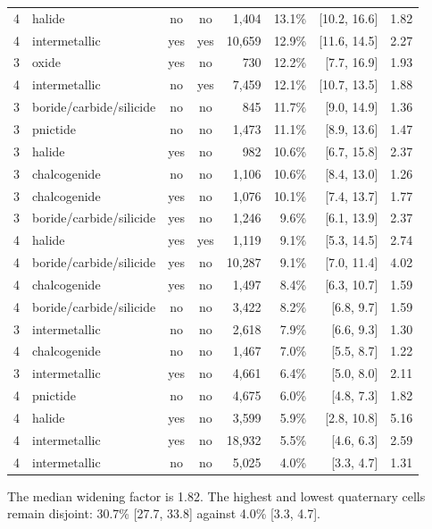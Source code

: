 \documentclass[11pt]{article}
\begin{document}
\begin{longtable}{llccrrrr}
4 & halide & no & no & 1{,}404 & 13.1\% & [10.2, 16.6] & 1.82 \\
4 & intermetallic & yes & yes & 10{,}659 & 12.9\% & [11.6, 14.5] & 2.27 \\
3 & oxide & yes & no & 730 & 12.2\% & [7.7, 16.9] & 1.93 \\
4 & intermetallic & no & yes & 7{,}459 & 12.1\% & [10.7, 13.5] & 1.88 \\
3 & boride/carbide/silicide & no & no & 845 & 11.7\% & [9.0, 14.9] & 1.36 \\
3 & pnictide & no & no & 1{,}473 & 11.1\% & [8.9, 13.6] & 1.47 \\
3 & halide & yes & no & 982 & 10.6\% & [6.7, 15.8] & 2.37 \\
3 & chalcogenide & no & no & 1{,}106 & 10.6\% & [8.4, 13.0] & 1.26 \\
3 & chalcogenide & yes & no & 1{,}076 & 10.1\% & [7.4, 13.7] & 1.77 \\
3 & boride/carbide/silicide & yes & no & 1{,}246 & 9.6\% & [6.1, 13.9] & 2.37 \\
4 & halide & yes & yes & 1{,}119 & 9.1\% & [5.3, 14.5] & 2.74 \\
4 & boride/carbide/silicide & yes & no & 10{,}287 & 9.1\% & [7.0, 11.4] & 4.02 \\
4 & chalcogenide & yes & no & 1{,}497 & 8.4\% & [6.3, 10.7] & 1.59 \\
4 & boride/carbide/silicide & no & no & 3{,}422 & 8.2\% & [6.8, 9.7] & 1.59 \\
3 & intermetallic & no & no & 2{,}618 & 7.9\% & [6.6, 9.3] & 1.30 \\
4 & chalcogenide & no & no & 1{,}467 & 7.0\% & [5.5, 8.7] & 1.22 \\
3 & intermetallic & yes & no & 4{,}661 & 6.4\% & [5.0, 8.0] & 2.11 \\
4 & pnictide & no & no & 4{,}675 & 6.0\% & [4.8, 7.3] & 1.82 \\
4 & halide & yes & no & 3{,}599 & 5.9\% & [2.8, 10.8] & 5.16 \\
4 & intermetallic & yes & no & 18{,}932 & 5.5\% & [4.6, 6.3] & 2.59 \\
4 & intermetallic & no & no & 5{,}025 & 4.0\% & [3.3, 4.7] & 1.31 \\
\bottomrule
\end{longtable}
\normalsize

The median widening factor is 1.82. The highest and lowest quaternary cells remain disjoint:
30.7\% [27.7, 33.8] against 4.0\% [3.3, 4.7].
\end{document}
